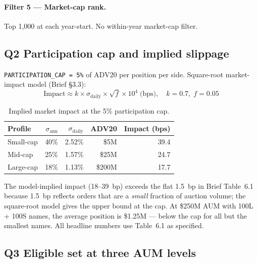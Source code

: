 \documentclass[12pt,a4paper]{article}
\begin{document}
\paragraph{Filter 5 --- Market-cap rank.}
Top 1,000 at each year-start.  No within-year market-cap filter.

\subsection*{Q2 \quad Participation cap and implied slippage}
\label{sec:s2q2}

\texttt{PARTICIPATION\_CAP = 5\%} of ADV20 per position per side.
Square-root market-impact model (Brief §3.3):
\[
\text{Impact} \approx k \times \sigma_{\text{daily}} \times \sqrt{f} \times 10^4
\;\text{(bps)},\quad k = 0.7,\; f = 0.05
\]

\begin{table}[H]
\centering
\caption{Implied market impact at the 5\% participation cap.}
\label{tab:slippage}
\begin{tabular}{lrrrr}
\toprule
Profile & $\sigma_{\text{ann}}$ & $\sigma_{\text{daily}}$ & ADV20 & Impact (bps) \\
\midrule
Small-cap  & 40\% & 2.52\% & \$5M   & 39.4 \\
Mid-cap    & 25\% & 1.57\% & \$25M  & 24.7 \\
Large-cap  & 18\% & 1.13\% & \$200M & 17.7 \\
\bottomrule
\end{tabular}
\end{table}

The model-implied impact (18--39~bp) exceeds the flat 1.5~bp in Brief
Table~6.1 because 1.5~bp reflects orders that are a \emph{small} fraction of
auction volume; the square-root model gives the upper bound at the cap.
At \$250M AUM with 100L + 100S names, the average position is \$1.25M ---
below the cap for all but the smallest names.  All headline numbers use
Table~6.1 as specified.

\subsection*{Q3 \quad Eligible set at three AUM levels}
\label{sec:s2q3}
\end{document}
